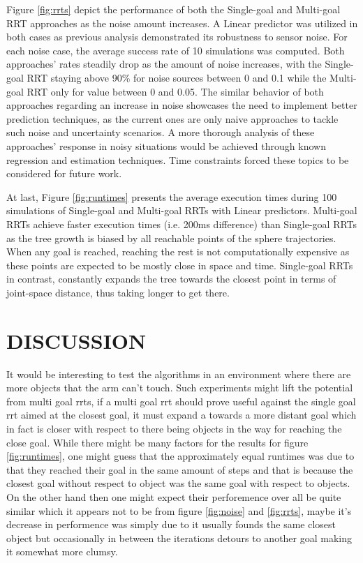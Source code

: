 \documentclass[letterpaper, 10 pt, conference]{ieeeconf}  %
\begin{document}

Figure \ref{fig:rrts} depict the performance of both the Single-goal and
Multi-goal RRT approaches as the noise amount increases. A Linear
predictor was utilized in both cases as previous analysis demonstrated
its robustness to sensor noise. For each noise case, the average success
rate of 10 simulations was computed. Both approaches’ rates steadily
drop as the amount of noise increases, with the Single-goal RRT staying
above 90\% for noise sources between 0 and 0.1 while the Multi-goal RRT
only for value between 0 and 0.05. The similar behavior of both
approaches regarding an increase in noise showcases the need to
implement better prediction techniques, as the current ones are only
naive approaches to tackle such noise and uncertainty scenarios. A more
thorough analysis of these approaches’ response in noisy situations
would be achieved through known regression and estimation techniques.
Time constraints forced these topics to be considered for future work.

At last, Figure \ref{fig:runtimes} presents the average execution times
during 100 simulations of Single-goal and Multi-goal RRTs with Linear
predictors. Multi-goal RRTs achieve faster execution times (i.e. 200ms
difference) than Single-goal RRTs as the tree growth is biased by all
reachable points of the sphere trajectories. When any goal is reached,
reaching the rest is not computationally expensive as these points are
expected to be mostly close in space and time. Single-goal RRTs in
contrast, constantly expands the tree towards the closest point in terms
of joint-space distance, thus taking longer to get there.

\section{DISCUSSION}

It would be interesting to test the algorithms in an environment where
there are more objects that the arm can't touch. Such experiments might
lift the potential from multi goal rrts,  if a multi goal rrt should
prove useful against the single goal rrt aimed at the closest goal, it
must expand a towards a more distant goal which in fact is closer with
respect to there being objects in the way for reaching the close goal.
While there might be many factors for the results for figure
\ref{fig:runtimes}, one might guess that the approximately equal
runtimes was due to that they reached their goal in the same amount of
steps and that is because the closest goal without respect to object was
the same goal with respect to objects. On the other hand then one might
expect their perforemence over all be quite similar which it appears not
to be from figure \ref{fig:noise} and \ref{fig:rrts}, maybe it's
decrease in performence was simply due to it usually founds the same
closest object but occasionally in between the iterations detours to
another goal making it somewhat more clumsy.
\end{document}
